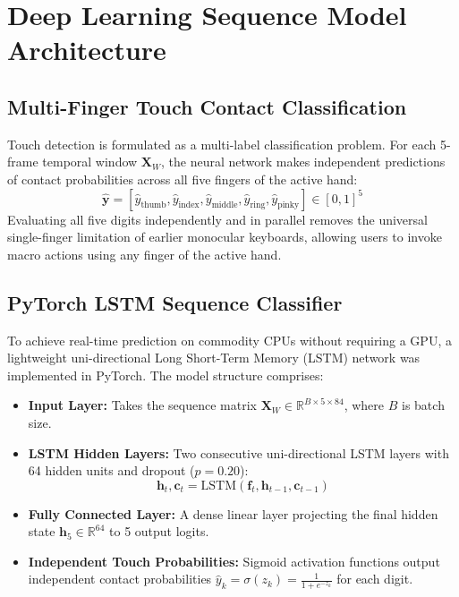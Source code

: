 \section{Deep Learning Sequence Model Architecture}
\label{sec:meth_dl_models}

\subsection{Multi-Finger Touch Contact Classification}
\label{subsec:meth_touch_formulation}
Touch detection is formulated as a multi-label classification problem. For each 5-frame temporal window $\mathbf{X}_W$, the neural network makes independent predictions of contact probabilities across all five fingers of the active hand:
\begin{equation}
\hat{\mathbf{y}} = \left[ \hat{y}_{\text{thumb}}, \hat{y}_{\text{index}}, \hat{y}_{\text{middle}}, \hat{y}_{\text{ring}}, \hat{y}_{\text{pinky}} \right] \in [0, 1]^5
\label{eq:meth_multilabel_prob}
\end{equation}
Evaluating all five digits independently and in parallel removes the universal single-finger limitation of earlier monocular keyboards, allowing users to invoke macro actions using any finger of the active hand.

\subsection{PyTorch LSTM Sequence Classifier}
\label{subsec:meth_lstm_arch}
To achieve real-time prediction on commodity CPUs without requiring a GPU, a lightweight uni-directional Long Short-Term Memory (LSTM) network was implemented in PyTorch. The model structure comprises:
\begin{itemize}
    \item \textbf{Input Layer:} Takes the sequence matrix $\mathbf{X}_W \in \mathbb{R}^{B \times 5 \times 84}$, where $B$ is batch size.
    \item \textbf{LSTM Hidden Layers:} Two consecutive uni-directional LSTM layers with 64 hidden units and dropout ($p = 0.20$):
    \begin{equation}
    \mathbf{h}_t, \mathbf{c}_t = \text{LSTM}(\mathbf{f}_t, \mathbf{h}_{t-1}, \mathbf{c}_{t-1})
    \label{eq:meth_lstm_step}
    \end{equation}
    \item \textbf{Fully Connected Layer:} A dense linear layer projecting the final hidden state $\mathbf{h}_5 \in \mathbb{R}^{64}$ to 5 output logits.
    \item \textbf{Independent Touch Probabilities:} Sigmoid activation functions output independent contact probabilities $\hat{y}_k = \sigma(z_k) = \frac{1}{1 + e^{-z_k}}$ for each digit.
\end{itemize}

